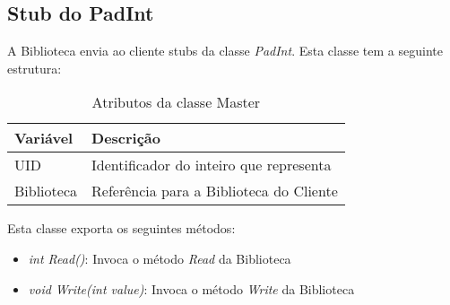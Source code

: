 \subsection{Stub do PadInt}

A Biblioteca envia ao cliente stubs da classe \textit{PadInt}. Esta classe tem a seguinte estrutura:

\begin{table}[H]
\centering
\begin{tabular}{| p{2cm} | p{} |}
\hline
\textbf{Variável} & \textbf{Descrição} \\
\hline
UID & Identificador do inteiro que representa \\
\hline
Biblioteca & Referência para a Biblioteca do Cliente \\
\hline
\end{tabular}
\caption{Atributos da classe Master}
\end{table}

Esta classe exporta os seguintes métodos:

\begin{itemize}
	\item \textit{int Read()}: Invoca o método \textit{Read} da Biblioteca
	\item \textit{void Write(int value)}: Invoca o método \textit{Write} da Biblioteca
\end{itemize}
